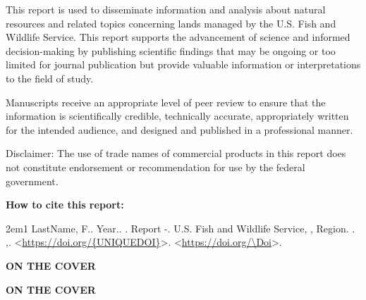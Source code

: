 \clearpage
\thispagestyle{empty}

This report is used to disseminate information and analysis about natural resources and related topics concerning lands managed by the U.S. Fish and Wildlife Service. This report supports the advancement of science and informed decision-making by publishing scientific findings that may be ongoing or too limited for journal publication but provide valuable information or interpretations to the field of study.

\vspace{12pt}
Manuscripts receive an appropriate level of peer review to ensure that the information is scientifically credible, technically accurate, appropriately written for the intended audience, and designed and published in a professional manner.

\vspace{12pt}
Disclaimer: The use of trade names of commercial products in this report does not constitute endorsement or recommendation for use by the federal government.

\vspace{12pt}
\noindent\textbf{How to cite this report:}\par

\begin{hangparas}{2em}{1}
\noindent
\ifx\CiteAuthorLine\empty LastName, F.\else \CiteAuthorLine\fi.\space
\ifx\ReportYear\empty Year.\else \ReportYear.\fi\space
\makeatletter\@title\makeatother.\space
Report \ReportYear-\ReportNumber.\space
U.S. Fish and Wildlife Service,\space
\FwsProgram,\space
\FwsRegion\space Region.\space
\ifx\FwsStation\empty
  \ifx\Location\empty\else \Location.\space\fi
\else
  \FwsStation\ifx\Location\empty\else,\space \Location\fi.\space
\fi
\ifx\Doi\empty
\textless\url{https://doi.org/\{UNIQUEDOI\}}\textgreater.
\else
\textless\url{https://doi.org/\Doi}\textgreater.
\fi
\end{hangparas}

\ifx\CoverCaption\empty
  \ifx\CoverImageCredit\empty\else
  \vspace*{\fill}
  {%
    \setlength{\parskip}{0pt}%
    {\bfseries\fontsize{12}{14}\selectfont ON THE COVER}\par
    \vspace{3pt}
    \CoverImageCredit\par
  }%
  \fi
\else
  \vspace*{\fill}
  {%
    \setlength{\parskip}{0pt}%
    {\bfseries\fontsize{12}{14}\selectfont ON THE COVER}\par
    \vspace{3pt}
    \CoverCaption\par
    \ifx\CoverImageCredit\empty\else
      \vspace{2pt}%
      \CoverImageCredit\par
    \fi
  }%
\fi

